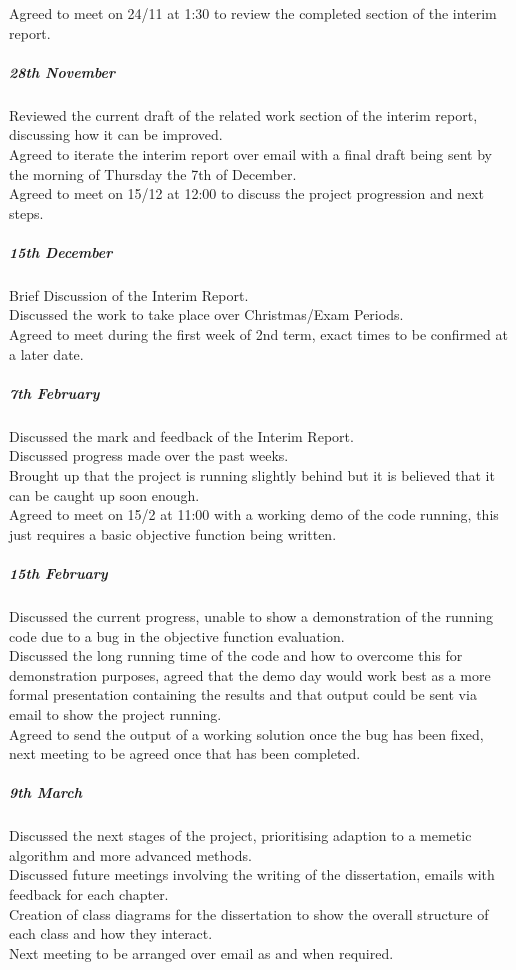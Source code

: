\documentclass[a4paper]{article}
\begin{document}
Agreed to meet on 24/11 at 1:30 to review the completed section of the interim report.\\
\subparagraph{28th November}
Reviewed the current draft of the related work section of the interim report, discussing how it can be improved.\\
Agreed to iterate the interim report over email with a final draft being sent by the morning of Thursday the 7th of December.\\
Agreed to meet on 15/12 at 12:00 to discuss the project progression and next steps.\\
\subparagraph{15th December}
Brief Discussion of the Interim Report.\\
Discussed the work to take place over Christmas/Exam Periods.\\
Agreed to meet during the first week of 2nd term, exact times to be confirmed at a later date.\\
\subparagraph{7th February}
Discussed the mark and feedback of the Interim Report.\\
Discussed progress made over the past weeks.\\
Brought up that the project is running slightly behind but it is believed that it can be caught up soon enough.\\
Agreed to meet on 15/2 at 11:00 with a working demo of the code running, this just requires a basic objective function being written.
\subparagraph{15th February}
Discussed the current progress, unable to show a demonstration of the running code due to a bug in the objective function evaluation.\\
Discussed the long running time of the code and how to overcome this for demonstration purposes, agreed that the demo day would work best as a more formal presentation containing the results and that output could be sent via email to show the project running.\\
Agreed to send the output of a working solution once the bug has been fixed, next meeting to be agreed once that has been completed.
\subparagraph{9th March}
Discussed the next stages of the project, prioritising adaption to a memetic algorithm and more advanced methods.\\
Discussed future meetings involving the writing of the dissertation, emails with feedback for each chapter.\\
Creation of class diagrams for the dissertation to show the overall structure of each class and how they interact.\\
Next meeting to be arranged over email as and when required.
\end{document}
